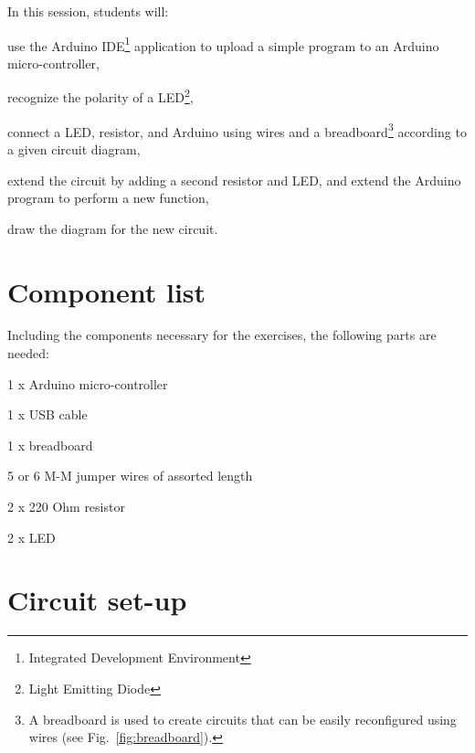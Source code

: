 \documentclass[12pt]{book}
\begin{document}
 In this session, students will:
\begin{compactitem}[--]
\item use the Arduino IDE\footnote{Integrated Development Environment}
  application to upload a simple program to an Arduino
  micro-controller,
\item recognize the polarity of a LED\footnote{Light Emitting
    Diode},
\item connect a LED, resistor, and Arduino using wires and a
  breadboard\footnote{A breadboard is used to create circuits that can
    be easily reconfigured using wires (see
    Fig.~\ref*{fig:breadboard}).} according to a given circuit diagram, 
\item extend the circuit by adding a second resistor and LED, and
  extend the Arduino program to perform a new function,
\item draw the diagram for the new circuit.
\end{compactitem}

\section{Component list}
Including the components necessary for the exercises, the following
parts are needed:
\begin{compactitem}[--]
  \item 1 x Arduino micro-controller
  \item 1 x USB cable
  \item 1 x breadboard
  \item 5 or 6 M-M jumper wires of assorted length
	\item 2 x 220 Ohm resistor
	\item 2 x LED
\end{compactitem}

\section{Circuit set-up}\label{se:setup1}
\end{document}
